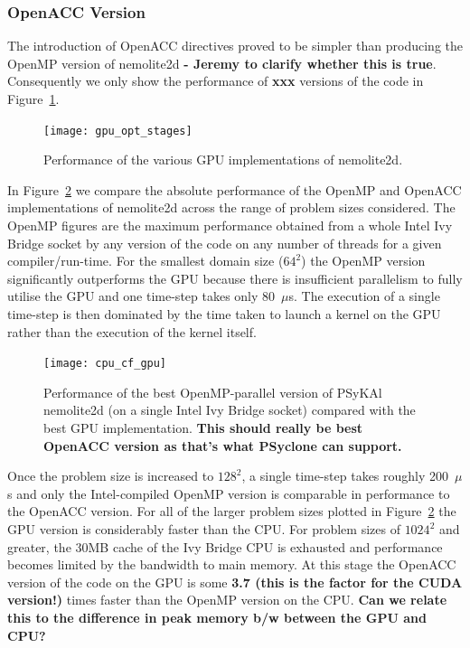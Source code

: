 \documentclass[journal]{IEEEtran}
\newcommand{\psykal}{{PS}y{KA}l\ }
\begin{document}
\subsubsection{OpenACC Version}

The introduction of OpenACC directives proved to be simpler than
producing the OpenMP version of nemolite2d {\bf - Jeremy to clarify
  whether this is true}.  Consequently we only show the performance of
{\bf xxx} versions of the code in Figure~\ref{FIG_gpu_opt_stages}.

\begin{figure}
\centering
\texttt{[image: gpu\_opt\_stages]}
\caption{Performance of the various GPU implementations of nemolite2d.}
\label{FIG_gpu_opt_stages}
\end{figure}

In Figure~\ref{FIG_cpu_cf_gpu} we compare the absolute performance of
the OpenMP and OpenACC implementations of nemolite2d across the range
of problem sizes considered. The OpenMP figures are the maximum
performance obtained from a whole Intel Ivy Bridge socket by any
version of the code on any number of threads for a given
compiler/run-time. For the smallest domain size ($64^2$) the OpenMP
version significantly outperforms the GPU because there is
insufficient parallelism to fully utilise the GPU and one time-step
takes only 80~$\mu$s. The execution of a single time-step is then
dominated by the time taken to launch a kernel on the GPU rather than
the execution of the kernel itself.

\begin{figure}
\centering
\texttt{[image: cpu\_cf\_gpu]}
\caption{Performance of the best OpenMP-parallel version of \psykal
  nemolite2d (on a single Intel Ivy Bridge socket) compared with the best GPU implementation. {\bf This should really be best OpenACC version as that's what PSyclone can support.}}
\label{FIG_cpu_cf_gpu}
\end{figure}

Once the problem size is increased to $128^2$, a single time-step
takes roughly 200~$\mu$s and only the Intel-compiled OpenMP version is
comparable in performance to the OpenACC version. For all of the
larger problem sizes plotted in Figure~\ref{FIG_cpu_cf_gpu} the GPU
version is considerably faster than the CPU.  For problem sizes of
$1024^2$ and greater, the 30MB cache of the Ivy Bridge CPU is
exhausted and performance becomes limited by the bandwidth to main
memory. At this stage the OpenACC version of the code on the GPU is
some {\bf 3.7 (this is the factor for the CUDA version!)} times faster
than the OpenMP version on the CPU. {\bf Can we relate this to the
  difference in peak memory b/w between the GPU and CPU?}
\end{document}
